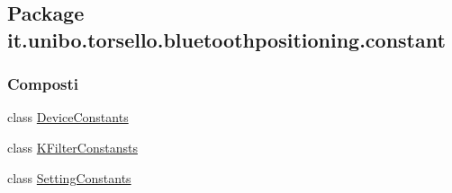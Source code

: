 \hypertarget{namespaceit_1_1unibo_1_1torsello_1_1bluetoothpositioning_1_1constant}{}\subsection{Package it.\+unibo.\+torsello.\+bluetoothpositioning.\+constant}
\label{namespaceit_1_1unibo_1_1torsello_1_1bluetoothpositioning_1_1constant}
\subsubsection*{Composti}
\begin{DoxyCompactItemize}
\item 
class \hyperlink{classit_1_1unibo_1_1torsello_1_1bluetoothpositioning_1_1constant_1_1DeviceConstants}{Device\+Constants}
\item 
class \hyperlink{classit_1_1unibo_1_1torsello_1_1bluetoothpositioning_1_1constant_1_1KFilterConstansts}{K\+Filter\+Constansts}
\item 
class \hyperlink{classit_1_1unibo_1_1torsello_1_1bluetoothpositioning_1_1constant_1_1SettingConstants}{Setting\+Constants}
\end{DoxyCompactItemize}
